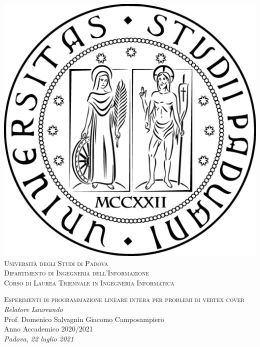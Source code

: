 \documentclass[a4paper,12pt]{book}
\begin{document}
\renewcommand{\contentsname}{\vspace{-2cm} Indice \vspace{-0.5cm}}

\begin{titlepage}

	\begin{center}
	
	\includegraphics[scale=0.11]{images/sigillo.eps} \\ %
	\vspace*{1cm}
	\textsc{\LARGE Università degli Studi di Padova}\\
	\vspace{0.25cm}
	\textsc{\normalsize Dipartimento di Ingegneria dell'Informazione}\\
	\vspace{0.25cm}
	\textsc{\normalsize Corso di Laurea Triennale in Ingegneria Informatica}
	
	\vfill
	\textsc{\LARGE Esperimenti di programmazione lineare intera per problemi di vertex cover}\\

	\vfill
	\vspace*{4cm}
	\textsl{\large Relatore} \hfill \textsl{\large Laureando}\\
	\large Prof. Domenico Salvagnin \hfill Giacomo Camposampiero\\
	
	\vfill
	{\large Anno Accademico 2020/2021}\\
	\textsl{\large Padova, 22 luglio 2021}
	\end{center}
\end{titlepage}
\end{document}
